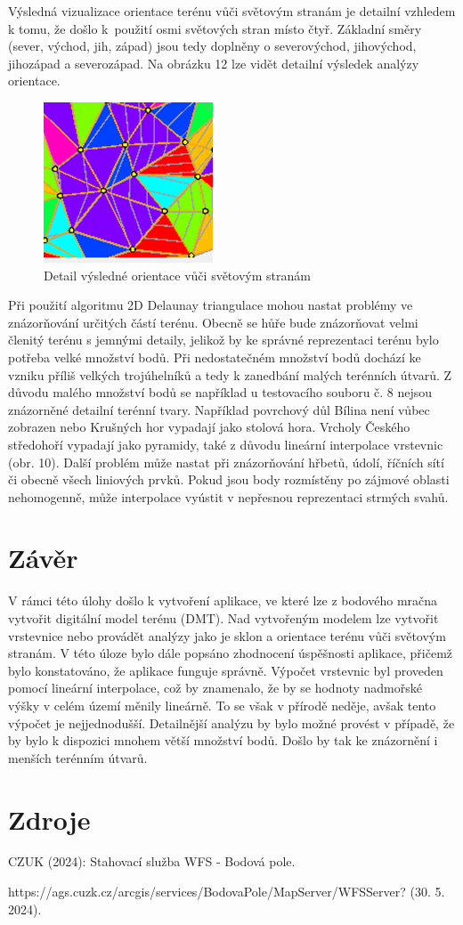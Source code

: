 \documentclass{article}
\begin{document}
\begin{spacing}{1.5}
\newpage
Výsledná vizualizace orientace terénu vůči světovým stranám je detailní vzhledem k tomu, že došlo k~použití osmi světových stran místo čtyř.  Základní směry (sever, východ, jih, západ) jsou tedy doplněny o severovýchod, jihovýchod, jihozápad a severozápad. Na obrázku 12 lze vidět detailní výsledek analýzy orientace. 

\begin{figure}[htbp]
    \centering
    \includegraphics[width=0.3\linewidth]{images/12orientace.png}
    \caption{Detail výsledné orientace vůči světovým stranám}
    \label{fig:enter-label}
\end{figure}

Při použití algoritmu 2D Delaunay triangulace mohou nastat problémy ve znázorňování určitých částí terénu. Obecně se hůře bude znázorňovat velmi členitý terénu s jemnými detaily, jelikož by ke správné reprezentaci terénu bylo potřeba velké množství bodů. Při nedostatečném množství bodů dochází ke vzniku příliš velkých trojúhelníků a tedy k zanedbání malých terénních útvarů. Z důvodu malého množství bodů se například u testovacího souboru č. 8 nejsou znázorněné detailní terénní tvary. Například povrchový důl Bílina není vůbec zobrazen nebo Krušných hor vypadají jako stolová hora. Vrcholy Českého středohoří vypadají jako pyramidy, také z důvodu lineární interpolace vrstevnic (obr. 10). Další problém může nastat při znázorňování hřbetů, údolí, říčních sítí či obecně všech liniových prvků. Pokud jsou body rozmístěny po zájmové oblasti nehomogenně, může interpolace vyústit v nepřesnou reprezentaci strmých svahů. 

\section{Závěr}
V rámci této úlohy došlo k vytvoření aplikace, ve které lze z bodového mračna vytvořit digitální model terénu (DMT). Nad vytvořeným modelem lze vytvořit vrstevnice nebo provádět analýzy jako je sklon a orientace terénu vůči světovým stranám. V této úloze bylo dále popsáno zhodnocení úspěšnosti aplikace, přičemž bylo konstatováno, že aplikace funguje správně. Výpočet vrstevnic byl proveden pomocí lineární interpolace, což by znamenalo, že by se hodnoty nadmořské výšky v celém území měnily lineárně. To se však v přírodě neděje, avšak tento výpočet je nejjednodušší. Detailnější analýzu by bylo možné provést v případě, že by bylo k dispozici mnohem větší množství bodů. Došlo by tak ke znázornění i menších terénním útvarů. 

\section{Zdroje}
CZUK (2024): Stahovací služba WFS - Bodová pole. 

\noindent https://ags.cuzk.cz/arcgis/services/BodovaPole/MapServer/WFSServer? (30. 5. 2024).

\end{spacing}
\end{document}
